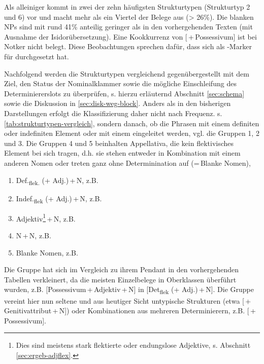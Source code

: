 Als alleiniger  kommt  in zwei der zehn häufigsten Strukturtypen (Strukturtyp 2 und 6) vor und macht mehr als ein Viertel der Belege aus (> 26\%). Die blanken NPs sind mit rund 41\% anteilig geringer als in den vorhergehenden Texten (mit Ausnahme der Isidorübersetzung). Eine Kookkurrenz von  [\,+\,Possessivum] ist bei Notker nicht belegt. Diese Beobachtungen sprechen dafür, dass  sich als -Marker für  durchgesetzt hat. 


Nachfolgend werden die Strukturtypen vergleichend gegenübergestellt mit dem Ziel, den Status der Nominalklammer sowie die mögliche Einschleifung des Determiniererslots  zu überprüfen, s. hierzu erläuternd Abschnitt \ref{sec:schema} sowie die Diskussion in \ref{sec:disk-weg-block}. Anders als in den bisherigen Darstellungen erfolgt die Klassifizierung  daher nicht nach Frequenz. s. \ref{tab:strukturtypen-vergleich}, sondern danach, ob die Phrasen mit einem definiten oder indefiniten Element oder mit einem  eingeleitet werden, vgl. die Gruppen 1, 2 und 3. Die Gruppen 4 und 5 beinhalten  Appellativa, die kein flektivisches  Element bei sich tragen, d.h. sie stehen entweder in Kombination mit einem anderen Nomen oder treten ganz ohne Determinination auf (=\,Blanke Nomen), 

\begin{enumerate}
\item Def.\textsubscript{flek.} (+ Adj.)\,+\,N, z.B.  
\item Indef.\textsubscript{flek} (+ Adj.)\,+\,N, z.B. 
\item Adjektiv\footnote{Dies sind meistens stark flektierte oder endungslose Adjektive, s. Abschnitt \ref{sec:ergeb-adjflex}.}\,+\,N, z.B.  
\item N\,+\,N, z.B. 
\item Blanke Nomen, z.B. 
\end{enumerate}

Die Gruppe  hat sich im Vergleich zu ihrem Pendant in den vorhergehenden Tabellen verkleinert, da die meisten Einzelbelege in Oberklassen überführt wurden,  z.B.   [Possessivum\,+\,Adjektiv\,+\,N] in [Det\textsubscript{flek} (+ Adj.)\,+\,N]. Die Gruppe vereint hier nun seltene und aus heutiger Sicht untypische Strukturen (etwa  [\,+ Genitivattribut\,+\,N]) oder Kombinationen aus mehreren  Determinierern, z.B.  [\,+\,Possessivum]. 

